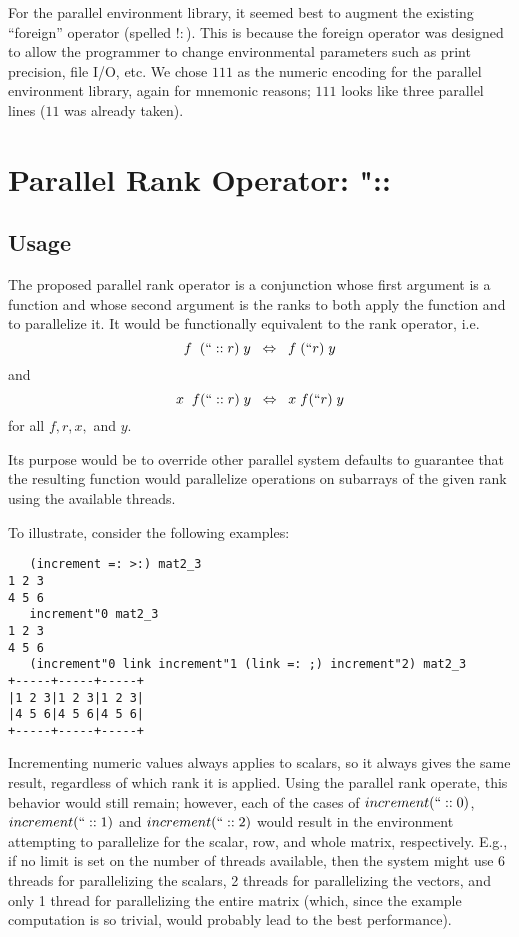 For the parallel environment library, 
it seemed best to augment the existing ``foreign'' operator (spelled $!:$).
This is because the foreign operator was designed to 
allow the programmer to change environmental parameters 
such as print precision, file I/O, etc. \cite{jvocab}
We chose $111$ as the numeric encoding for the parallel environment library, again for mnemonic reasons; 
$111$ looks like three parallel lines ($11$ was already taken).

\section{Parallel Rank Operator: \ttfamily"::\normalfont}
\label{prank}

\subsection{Usage}
The proposed parallel rank operator is a conjunction 
whose first argument is a function 
and whose second argument is the ranks to both apply the function and to parallelize it. 
It would be functionally equivalent to the rank operator, i.e. 
\[f\;\;(``::r)\;y\;\;\Leftrightarrow\;\;f\;(``r)\;y\] and \[x\;\;f(``::r)\;y\;\;\Leftrightarrow\;\;x\;f(``r)\;y\] for all $f, r, x,$ and $y$.

Its purpose would be to override other parallel system defaults 
to guarantee that the resulting function would parallelize operations on subarrays of the given rank 
using the available threads.

To illustrate, consider the following examples:

\begin{singlespacing}
\begin{small}
\begin{verbatim}
   (increment =: >:) mat2_3
1 2 3
4 5 6
   increment"0 mat2_3
1 2 3
4 5 6
   (increment"0 link increment"1 (link =: ;) increment"2) mat2_3
+-----+-----+-----+
|1 2 3|1 2 3|1 2 3|
|4 5 6|4 5 6|4 5 6|
+-----+-----+-----+
\end{verbatim}
\end{small}
\end{singlespacing}

Incrementing numeric values always applies to scalars, so it always gives the same result, 
regardless of which rank it is applied. 
Using the parallel rank operate, this behavior would still remain; 
however, each of the cases of $increment(``::0)$, $increment(``::1)$ and $increment(``::2)$ 
would result in the environment attempting to parallelize for the scalar, row, and whole matrix, respectively.
E.g., if no limit is set on the number of threads available, 
then the system might use 6 threads for parallelizing the scalars, 
2 threads for parallelizing the vectors, 
and only 1 thread for parallelizing the entire matrix 
(which, since the example computation is so trivial, would probably lead to the best performance).

